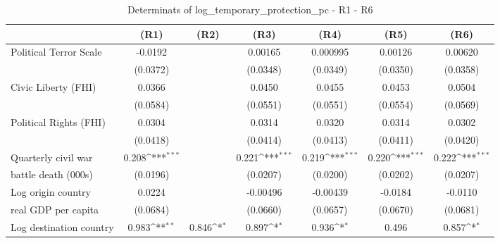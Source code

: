 \begin{table}[htbp]\centering \scriptsize
\def\sym#1{\ifmmode^{#1}\else\(^{#1}\)\fi}
\caption{Determinats of log\_temporary\_protection\_pc - R1 - R6}
\begin{tabular}{l*{6}{c}}
\hline\hline
                    &\multicolumn{1}{c}{(R1)}&\multicolumn{1}{c}{(R2)}&\multicolumn{1}{c}{(R3)}&\multicolumn{1}{c}{(R4)}&\multicolumn{1}{c}{(R5)}&\multicolumn{1}{c}{(R6)}\\
 \hline
Political Terror Scale&     -0.0192         &                     &     0.00165         &    0.000995         &     0.00126         &     0.00620         \\
                    &    (0.0372)         &                     &    (0.0348)         &    (0.0349)         &    (0.0350)         &    (0.0358)         \\
[0,5em]
Civic Liberty (FHI) &      0.0366         &                     &      0.0450         &      0.0455         &      0.0453         &      0.0504         \\
                    &    (0.0584)         &                     &    (0.0551)         &    (0.0551)         &    (0.0554)         &    (0.0569)         \\
[0,5em]
Political Rights (FHI)&      0.0304         &                     &      0.0314         &      0.0320         &      0.0314         &      0.0302         \\
                    &    (0.0418)         &                     &    (0.0414)         &    (0.0413)         &    (0.0411)         &    (0.0420)         \\
[0,5em]
Quarterly civil war&       0.208\sym{***}&                     &       0.221\sym{***}&       0.219\sym{***}&       0.220\sym{***}&       0.222\sym{***}\\
 battle death (000s)                    &    (0.0196)         &                     &    (0.0207)         &    (0.0200)         &    (0.0202)         &    (0.0207)         \\
[0,5em]
Log origin country &      0.0224         &                     &    -0.00496         &    -0.00439         &     -0.0184         &     -0.0110         \\
real GDP per capita                    &    (0.0684)         &                     &    (0.0660)         &    (0.0657)         &    (0.0670)         &    (0.0681)         \\
[0,5em]
Log destination country&       0.983\sym{**} &       0.846\sym{*}  &       0.897\sym{*}  &       0.936\sym{*}  &       0.496         &       0.857\sym{*}  \\

\end{tabular}
\end{table}
